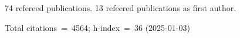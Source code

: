 74 refereed publications. 13 refeered publications as first author.

Total citations~=~4564; h-index~=~36 (2025-01-03)